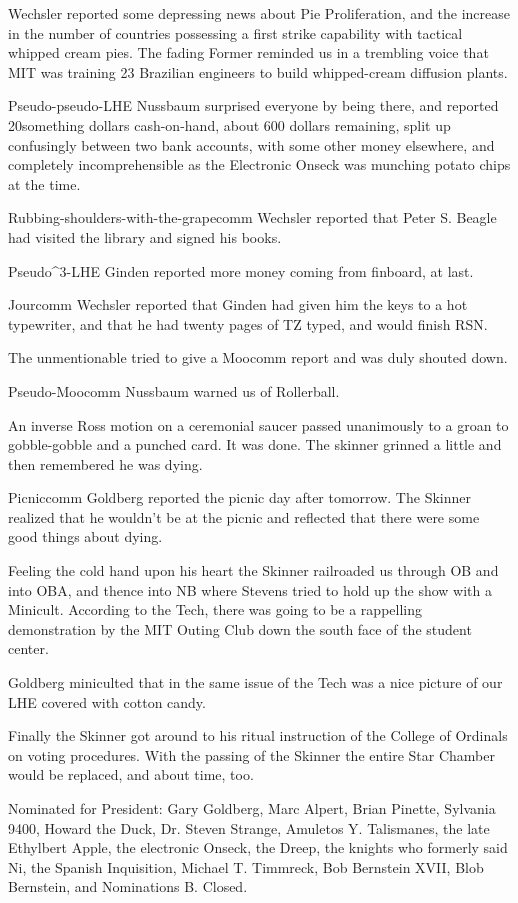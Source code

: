 \documentclass[12pt]{article}
\begin{document}
Wechsler reported some depressing news about Pie Proliferation, and the increase in the number of countries possessing a first strike capability with tactical whipped cream pies. The fading Former reminded us in a trembling voice that MIT was training 23 Brazilian engineers to build whipped-cream diffusion plants.

Pseudo-pseudo-LHE Nussbaum surprised everyone by being there, and reported 20something dollars cash-on-hand, about 600 dollars remaining, split up confusingly between two bank accounts, with some other money elsewhere, and completely incomprehensible as the Electronic Onseck was munching potato chips at the time.

Rubbing-shoulders-with-the-grapecomm Wechsler reported that Peter S. Beagle had visited the library and signed his books.

Pseudo^3-LHE Ginden reported more money coming from finboard, at last.

Jourcomm Wechsler reported that Ginden had given him the keys to a hot typewriter, and that he had twenty pages of TZ typed, and would finish RSN.

The unmentionable tried to give a Moocomm report and was duly shouted down.

Pseudo-Moocomm Nussbaum warned us of Rollerball.

An inverse Ross motion on a ceremonial saucer passed unanimously to a groan to gobble-gobble and a punched card. It was done. The skinner grinned a little and then remembered he was dying.

Picniccomm Goldberg reported the picnic day after tomorrow. The Skinner realized that he wouldn't be at the picnic and reflected that there were some good things about dying.

Feeling the cold hand upon his heart the Skinner railroaded us through OB and into OBA, and thence into NB where Stevens tried to hold up the show with a Minicult. According to the Tech, there was going to be a rappelling demonstration by the MIT Outing Club down the south face of the student center.

Goldberg miniculted that in the same issue of the Tech was a nice picture of our LHE covered with cotton candy.

Finally the Skinner got around to his ritual instruction of the College of Ordinals on voting procedures. With the passing of the Skinner the entire Star Chamber would be replaced, and about time, too.

Nominated for President: Gary Goldberg, Marc Alpert, Brian Pinette, Sylvania 9400, Howard the Duck, Dr. Steven Strange, Amuletos Y. Talismanes, the late Ethylbert Apple, the electronic Onseck, the Dreep, the knights who formerly said Ni, the Spanish Inquisition, Michael T. Timmreck, Bob Bernstein XVII, Blob Bernstein, and Nominations B. Closed.
\end{document}
